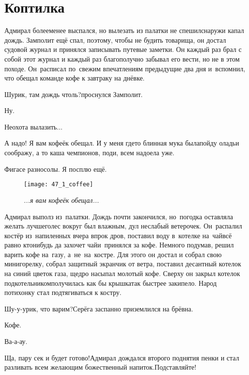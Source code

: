 \chapter{Коптилка}
\vepsianrose

Адмирал более\sdash менее выспался, но вылезать из палатки не спешил\mdash снаружи капал дождь. Замполит ещё спал, поэтому, чтобы не будить товарища, он достал судовой журнал и принялся записывать путевые заметки. Он каждый раз брал с собой этот журнал и каждый раз благополучно забывал его вести, но не в этом походе. Он~расписал по~свежим впечатлениям предыдущие два дня и~вспомнил, что обещал команде кофе к завтраку на днёвке.

\diagdash Шурик, там дождь чтоль?\mdash проснулся Замполит.

\diagdash Ну.

\diagdash Неохота вылазить$\ldots$

\diagdash А надо! Я вам кофеёк обещал. И у меня где\sdash то блинная мука была\mdash пойду оладьи соображу, а то каша чемпионов, поди, всем надоела уже.

\diagdash Фигасе разносолы. Я посплю ещё.

\newpage
\begin{wrapfigure}[13]{l}{0.5\textwidth}
	\centering
	\texttt{[image: 47\_1\_coffee]}
	\caption{\small\textit{...я вам кофеёк обещал...}}
\end{wrapfigure}
Адмирал выполз из~палатки. Дождь почти закончился, но~погодка оставляла желать лучшего\mdash лес вокруг был влажным, дул неслабый ветерочек. Он~распалил костёр из~напиленных вчера впрок дров, поставил воду в~котелке на~чай\mdash всё равно кто\sdash нибудь да захочет чай\mdash и~принялся за кофе. Немного подумав, решил варить кофе на~газу, а~не~на~костре. Для этого он достал и собрал свою мини\sdash горелку, собрал защитный экранчик от ветра, поставил десантный котелок на синий цветок газа, щедро насыпал молотый кофе. Сверху он закрыл котелок подкотельником\mdash получилась как бы крышка\mdash так быстрее закипело. Народ потихонку стал подтягиваться к костру.

\diagdash Шу-у-урик, что варим?\mdash Серёга заспанно приземлился на брёвна.

\diagdash Кофе.

\diagdash Ва-а-ау.

\diagdash Ща, пару сек и будет готово!\mdash Адмирал дождался второго поднятия пенки и стал разливать всем желающим божественный напиток.\mdash Подставляйте!

